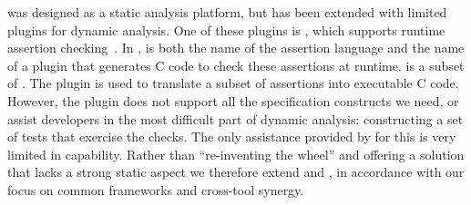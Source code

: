 \framac was designed as a static analysis platform, but has been extended with limited plugins for dynamic analysis.
One of these plugins is \eacsl, which supports runtime assertion checking~\cite{CR2006:SEN}.
In \framac, \eacsl is both the name of the assertion language and the name of a plugin that generates C code to check these assertions at runtime.
\eacsl is a subset of \acsl.  The plugin \eacsl is used to translate a subset of \framac assertions into executable C code.
However, the \eacsl plugin does not support all the specification constructs we need, or assist developers in the most difficult part of dynamic analysis:  constructing a set of tests that exercise the checks.  The only assistance provided by \framac for this is very limited in capability.  Rather than ``re-inventing the wheel'' and offering a solution that lacks a strong static aspect we therefore extend \acsl and \eacsl, in accordance with our focus on common frameworks and cross-tool synergy. 